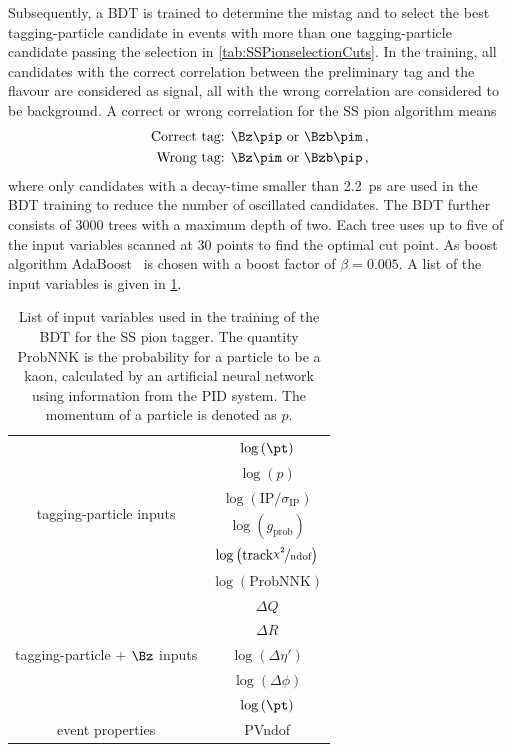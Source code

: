 Subsequently, a BDT is trained to determine the mistag and to select the best tagging-particle candidate in events with more than one tagging-particle candidate passing  the selection in \cref{tab:SSPionselectionCuts}.
In the training, all candidates with the correct correlation between the preliminary tag and the \B flavour are considered as signal, all with the wrong correlation are considered to be background.
A correct or wrong correlation for the SS pion algorithm means
\begin{align*}
	\text{Correct tag: }& \Bz\pip \text{ or } \Bzb\pim\,,\\
	\text{Wrong tag: }& \Bz\pim \text{ or } \Bzb\pip\,,
\end{align*}
where only \B candidates with a decay-time smaller than \SI{2.2}{\pico\second} are used in the BDT training to reduce the number of oscillated \B candidates.
The BDT further consists of \num{3000} trees with a maximum depth of two.
Each tree uses up to five of the input variables scanned at 30 points to find the optimal cut point.
As boost algorithm AdaBoost~\cite{AdaBoost} is chosen with a boost factor of $\beta=0.005$.
A list of the input variables is given in \cref{tab:BDTInputSSPion}.
\begin{table}[tbp]
	\centering
	\caption{List of input variables used in the training of the BDT for the SS pion tagger.
	The quantity $\mathrm{ProbNNK}$ is the probability for a particle to be a kaon, calculated by an artificial neural network using information from the \lhcb PID system.
	The momentum of a particle is denoted as $p$.}
	\begin{tabular}{cc}
		\toprule
		\multirow{6}{*}{tagging-particle inputs} 	& $\log\left(\pt\right)$ \\
													& $\log\left(p\right)$ \\
													& $\log\left(\text{IP}/\sigma_\text{IP}\right)$\\
													& $\log\left(g_\text{prob}\right)$\\
													& $\log\left(\text{track} \nicefrac{\chi^2}{\text{ndof}}\right)$ \\
													& $\log\left(\text{ProbNNK}\right)$\\
		\midrule
		\multirow{5}{*}{tagging-particle + $\Bz$ inputs}	& $\Delta Q$\\
															& $\Delta R$\\
															& $\log\left(\Delta\eta'\right)$\\
															& $\log\left(\Delta\phi\right)$\\
															& $\log\left(\pt\right)$\\
		\midrule
		\multirow{1}{*}{event properties}	& PVndof\\
		\bottomrule
	\end{tabular}
	\label{tab:BDTInputSSPion}
\end{table}
